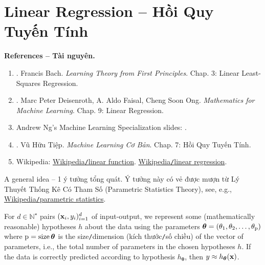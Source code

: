 \documentclass{article}
\begin{document}
\section{Linear Regression -- Hồi Quy Tuyến Tính}
\textbf{\textsf{References -- Tài nguyên.}}
\begin{enumerate}
	\item \cite{Bach2024}. {\sc Francis Bach}. {\it Learning Theory from First Principles}. Chap. 3: Linear Least-Squares Regression.
	\item \cite{Deisenroth_Faisal_Ong2023}. {\sc Marc Peter Deisenroth, A. Aldo Faisal, Cheng Soon Ong}. {\it Mathematics for Machine Learning}. Chap. 9: Linear Regression.
	\item {\sc Andrew Ng}'s Machine Learning Specialization slides: \url{}.
	\item \cite{Tiep_ML_co_ban}. {\sc Vũ Hữu Tiệp}. {\it Machine Learning Cơ Bản}. Chap. 7: Hồi Quy Tuyến Tính.
	\item Wikipedia: \href{https://en.wikipedia.org/wiki/Linear_function}{Wikipedia{\tt/}linear function}. \href{https://en.wikipedia.org/wiki/Linear_regression}{Wikipedia{\tt/}linear regression}.
\end{enumerate}
{\sf A general idea -- 1 ý tưởng tổng quát.} Ý tưởng này có vẻ được mượn từ Lý Thuyết Thống Kê Có Tham Số (Parametric Statistics Theory), see, e.g., \href{https://en.wikipedia.org/wiki/Parametric_statistics}{Wikipedia{\tt/}parametric statistics}.

For $d\in\mathbb{N}^\star$ pairs $({\bf x}_i,y_i)_{i=1}^d$ of input-output, we represent some (mathematically reasonable) hypotheses $h$ about the data using the parameters $\boldsymbol{\theta} = (\theta_1,\theta_2,\ldots,\theta_{\rm p})$ where ${\rm p} = \operatorname{size}\boldsymbol{\theta}$ is the size{\tt/}dimension (kích thước{\tt/}số chiều) of the vector of parameters, i.e., the total number of parameters in the chosen hypotheses $h$. If the data is correctly predicted according to hypothesis $h_{\boldsymbol{\theta}}$, then $y\approx h_{\boldsymbol{\theta}}({\bf x})$.
\end{document}
